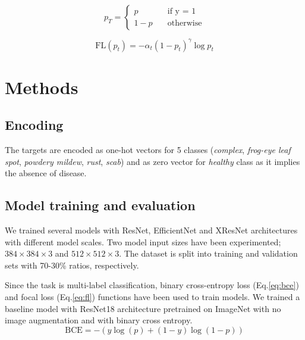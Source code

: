 \documentclass[conference]{IEEEtran}
\begin{document}
\begin{equation*}
    p_T = 
    \begin{cases}
        p &\quad \text{if y = 1} \\
        1 - p &\quad \text{otherwise}
    \end{cases}
\end{equation*}

\begin{equation}
    \text{FL}(p_t) = -\alpha_t (1 - p_t)^{\gamma}\log{p_t} \label{eq:fl}
\end{equation}

\section{Methods}

\subsection{Encoding}
The targets are encoded as one-hot vectors for 5 classes 
(\textit{complex}, \textit{frog-eye leaf spot}, \textit{powdery mildew}, 
\textit{rust}, \textit{scab}) and 
as zero vector for \textit{healthy} class as it implies the absence of disease.

\subsection{Model training and evaluation}
We trained several models with ResNet, EfficientNet and XResNet architectures 
with different model scales. Two model input sizes have been experimented; 
$384 \times 384 \times 3$ and $512 \times 512 \times 3$. 
The dataset is split into training and validation sets with 70-30\% ratios, respectively.

Since the task is multi-label classification, binary cross-entropy loss (Eq.\ref{eq:bce})
and focal loss (Eq.\ref{eq:fl}) functions have been used to train models. 
We trained a baseline model with ResNet18 architecture pretrained on ImageNet 
with no image augmentation and with binary cross entropy. 
\begin{equation*}
    \text{BCE} = -{(y\log(p) + (1 - y)\log(1 - p))} \label{eq:bce}
\end{equation*}
\end{document}
